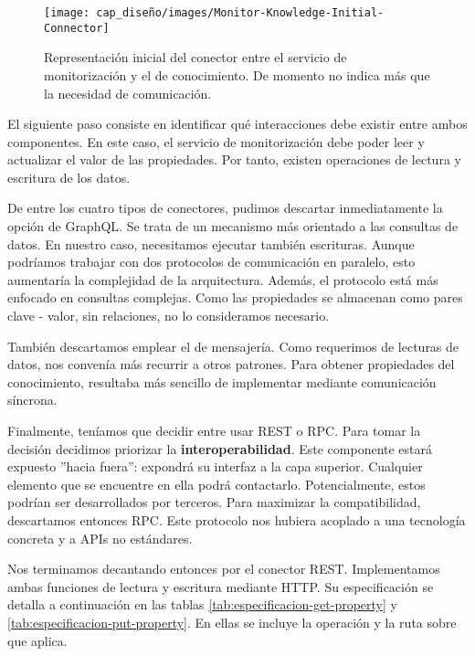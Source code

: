 \begin{wrapfigure}{r}{0.38\linewidth}
  \centering
  \vspace{10pt}
  \texttt{[image: cap\_diseño/images/Monitor-Knowledge-Initial-Connector]}
  \caption{Representación inicial del conector entre el servicio de monitorización y el de conocimiento. De momento no indica más que la necesidad de comunicación.}
  \label{fig:monitor-knowledge-initial}
  \vspace{2pt}
\end{wrapfigure}

El siguiente paso consiste en identificar qué interacciones debe existir entre ambos componentes. En este caso, el servicio de monitorización debe poder leer y actualizar el valor de las propiedades. Por tanto, existen operaciones de lectura y escritura de los datos.

De entre los cuatro tipos de conectores, pudimos descartar inmediatamente la opción de GraphQL. Se trata de un mecanismo más orientado a las consultas de datos. En nuestro caso, necesitamos ejecutar también escrituras. Aunque podríamos trabajar con dos protocolos de comunicación en paralelo, esto aumentaría la complejidad de la arquitectura. Además, el protocolo está más enfocado en consultas complejas. Como las propiedades se almacenan como pares clave - valor, sin relaciones, no lo consideramos necesario.

También descartamos emplear el  de mensajería. Como requerimos de lecturas de datos, nos convenía más recurrir a otros patrones. Para obtener propiedades del conocimiento, resultaba más sencillo de implementar mediante comunicación síncrona.

Finalmente, teníamos que decidir entre usar REST o RPC. Para tomar la decisión decidimos priorizar la \textbf{interoperabilidad}. Este componente estará expuesto ''hacia fuera'': expondrá su interfaz a la capa superior. Cualquier elemento que se encuentre en ella podrá contactarlo. Potencialmente, estos podrían ser desarrollados por terceros. Para maximizar la compatibilidad, descartamos entonces RPC. Este protocolo nos hubiera acoplado a una tecnología concreta y a APIs no estándares.

Nos terminamos decantando entonces por el conector REST. Implementamos ambas funciones de lectura y escritura mediante  HTTP. Su especificación se detalla a continuación en las tablas \ref{tab:especificacion-get-property} y \ref{tab:especificacion-put-property}. En ellas se incluye la operación y la ruta sobre que aplica.

